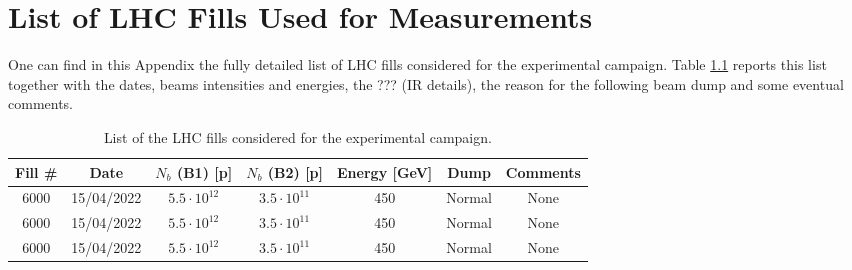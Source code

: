 \chapter{List of LHC Fills Used for Measurements} %

\label{AppendixB} %



One can find in this Appendix the fully detailed list of LHC fills considered for the experimental campaign.
Table \ref{table:experimental_fills} reports this list together with the dates, beams intensities and energies, the ??? (IR details), the reason for the following beam dump and some eventual comments.

\begin{table}[!hbt]
    \centering
    \begin{tabular}{|c|c|c|c|c|c|c|}
        \toprule
        \textbf{Fill \#} & \textbf{Date} & \textbf{$N_b$ (B1) [p]} & \textbf{$N_b$ (B2) [p]} & \textbf{Energy [GeV]} & \textbf{Dump} & \textbf{Comments} \\
        \midrule
            6000  &  15/04/2022  &  $5.5 \cdot 10^{12}$  &  $3.5 \cdot 10^{11}$  &  450  &  Normal  &  None  \\
            6000  &  15/04/2022  &  $5.5 \cdot 10^{12}$  &  $3.5 \cdot 10^{11}$  &  450  &  Normal  &  None  \\
            6000  &  15/04/2022  &  $5.5 \cdot 10^{12}$  &  $3.5 \cdot 10^{11}$  &  450  &  Normal  &  None  \\
        \bottomrule
    \end{tabular}
    \caption{List of the LHC fills considered for the experimental campaign.}
    \label{table:experimental_fills}
 \end{table}